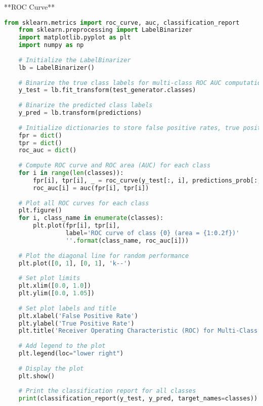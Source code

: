 **ROC Curve**
\begin{lstlisting}[language=Python]
    from sklearn.metrics import roc_curve, auc, classification_report
    from sklearn.preprocessing import LabelBinarizer
    import matplotlib.pyplot as plt
    import numpy as np
    
    # Initialize the LabelBinarizer
    lb = LabelBinarizer()
    
    # Binarize the true class labels for multi-class ROC AUC computation
    y_test = lb.fit_transform(test_generator.classes)
    
    # Binarize the predicted class labels
    y_pred = lb.transform(predictions)
    
    # Initialize dictionaries to store false positive rates, true positive rates, and AUC for each class
    fpr = dict()
    tpr = dict()
    roc_auc = dict()
    
    # Compute ROC curve and ROC area (AUC) for each class
    for i in range(len(classes)):
        fpr[i], tpr[i], _ = roc_curve(y_test[:, i], predictions_prob[:, i])
        roc_auc[i] = auc(fpr[i], tpr[i])
    
    # Plot all ROC curves for each class
    plt.figure()
    for i, class_name in enumerate(classes):
        plt.plot(fpr[i], tpr[i],
                 label='ROC curve of class {0} (area = {1:0.2f})'
                 ''.format(class_name, roc_auc[i]))
    
    # Plot the diagonal line for random performance
    plt.plot([0, 1], [0, 1], 'k--')
    
    # Set plot limits
    plt.xlim([0.0, 1.0])
    plt.ylim([0.0, 1.05])
    
    # Set plot labels and title
    plt.xlabel('False Positive Rate')
    plt.ylabel('True Positive Rate')
    plt.title('Receiver Operating Characteristic (ROC) for Multi-Class Classification')
    
    # Add legend to the plot
    plt.legend(loc="lower right")
    
    # Display the plot
    plt.show()
    
    # Print the classification report for all classes
    print(classification_report(y_test, y_pred, target_names=classes))
\end{lstlisting}

